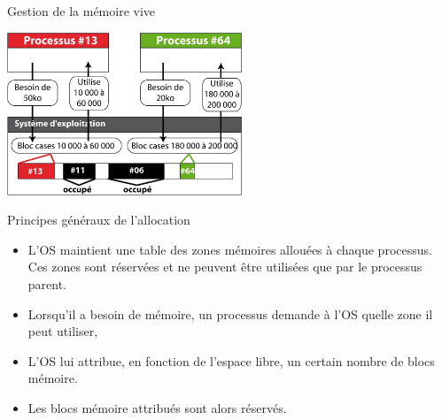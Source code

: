 \begin{frame}{Gestion de la mémoire vive}
  \begin{center}
    \includegraphics[width=7cm]{img/s03/Alloc_mem_3.jpg}
  \end{center}
  \begin{block}{Principes généraux de l'allocation}
    \begin{itemize}
    \item L'OS maintient une table des zones mémoires allouées à chaque
      processus. Ces zones sont réservées et ne peuvent être utilisées
      que par le processus parent.
    \item Lorsqu'il a besoin de mémoire, un processus demande à l'OS
      quelle zone il peut utiliser,
    \item L'OS lui attribue, en fonction de l'espace libre, un certain
      nombre de blocs mémoire.
    \item Les blocs mémoire attribués sont alors réservés.
    \end{itemize}
  \end{block}
\end{frame}
